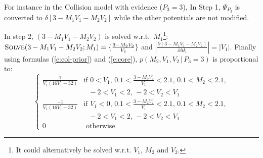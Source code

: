\documentclass{article}
\newcommand{\otherwise}[1]{#1 &\text{ otherwise}}
\newcommand{\pr}{p}
\begin{document}
For instance in the Collision model with evidence ($P_3 = 3$),
In Step 1, $\Psi_{P_3}$ is converted to $\delta[3 - M_1 V_1 - M_2 V_2]$ while the other potentials are not modified.

 In step 2, $(3 - M_1 V_1 - M_2 V_2)$ is solved w.r.t.\ $M_1$\footnote{It could alternatively be solved w.r.t. $V_1$, $M_2$ and $V_2$.}:
\\
$\textsc{Solve}(3 - M_1 V_1 - M_2 V_2; M_1) = \{\frac{3 - M_2 V_2}{V_1}\}$ 
and $\left| \frac{\partial (3 - M_1 V_1 - M_2 V_2)}{\partial M_1} \right| = |V_1|$.
Finally using formulas (\ref{e:col-prior}) and (\ref{e:core}), 
$\pr(M_2, V_1, V_2 \,|\, P_3 = 3)$ is proportional to:
{\footnotesize
\begin{equation}  
\label{e:col-prior2}
\begin{cases}
\frac{1}{V_1(16 V_1 + 32)} &{\text{if }\scriptstyle 0<V_1, \, 0.1<\frac{3-M_2 V_2}{V_1}<2.1, \, 0.1<M_2<2.1,}\\
							 &{\;\;\, \scriptstyle -2<V_1<2, \, -2<V_2 < V_1}\\
\frac{-1}{V_1(16 V_1 + 32)} &{\text{if }\scriptstyle V_1<0, \, 0.1<\frac{3-M_2 V_2}{V_1}<2.1, \, 0.1<M_2<2.1,}\\
							 &{\;\;\, \scriptstyle -2<V_1<2, \, -2<V_2 < V_1}\\
 \otherwise{0}
 \end{cases}
\end{equation}
}
\end{document}
